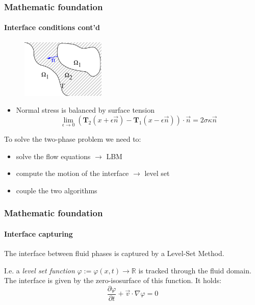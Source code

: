 \documentclass[ucs]{beamer}
\begin{document}
\begin{frame}
\frametitle{Mathematic foundation}
\framesubtitle{Interface conditions cont'd}
\begin{figure}[h!]
\includegraphics[width=4cm]{skizze.png}
\end{figure}
\begin{itemize}
\item<1->Normal stress is balanced by surface tension
  $$\lim_{\epsilon \to 0}(\textbf{T}_2(x+\epsilon \vec n) - \textbf{T}_1(x-\epsilon \vec n)) \cdot \vec n= 2\sigma \kappa \vec n$$
\end{itemize}
\vspace{-.5cm}
\end{frame}

\begin{frame}
To solve the two-phase problem we need to:
\begin{itemize}
\item<1-> solve the flow equations $\rightarrow$ LBM
\item<2-> compute the motion of the interface $\rightarrow$ level set
\item<3-> couple the two algorithms
\end{itemize}
\end{frame}

\begin{frame}
\frametitle{Mathematic foundation}
\framesubtitle{Interface capturing}
The interface between fluid phases is captured by a Level-Set Method.

I.e. a \textit{level set function} $\varphi:= \varphi(x,t) \rightarrow \mathbb{R}$ is tracked through the fluid domain. The interface is given by the zero-isosurface of this function.
It holds:
$$ \frac{\partial \varphi}{\partial t} + \vec v \cdot \nabla \varphi = 0$$
\end{frame}
\end{document}
